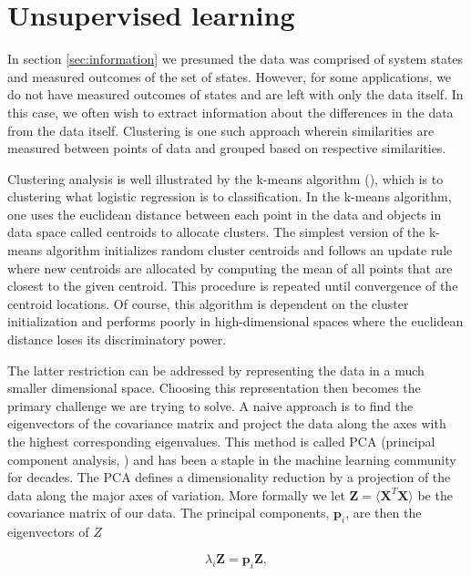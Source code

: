 \section{Unsupervised learning}\label{sec:unsupervised_learning}

In section \ref{sec:information} we presumed the data was comprised of system states and measured outcomes of the set of states. However, for some applications, we do not have measured outcomes of states and are left with only the data itself. In this case, we often wish to extract information about the differences in the data from the data itself. Clustering is one such approach wherein similarities are measured between points of data and grouped based on respective similarities.

Clustering analysis is well illustrated by the k-means algorithm (\cite{Neyman1967}), which is to clustering what logistic regression is to classification.  In the k-means algorithm, one uses the euclidean distance between each point in the data and objects in data space called centroids to allocate clusters. The simplest version of the k-means algorithm initializes random cluster centroids and follows an update rule where new centroids are allocated by computing the mean of all points that are closest to the given centroid. This procedure is repeated until convergence of the centroid locations. Of course, this algorithm is dependent on the cluster initialization and performs poorly in high-dimensional spaces where the euclidean distance loses its discriminatory power. 

The latter restriction can be addressed by representing the data in a much smaller dimensional space. Choosing this representation then becomes the primary challenge we are trying to solve. A naive approach is to find the eigenvectors of the covariance matrix and project the data along the axes with the highest corresponding eigenvalues. This method is called PCA (principal component analysis, \cite{Marsland2009}) and has been a staple in the machine learning community for decades. The PCA defines a dimensionality reduction by a projection of the data along the major axes of variation. More formally we let $\mathbf{Z} = \langle \mathbf{X}^T\mathbf{X}\rangle$ be the covariance matrix of our data. The principal components, $\mathbf{p}_i$, are then the eigenvectors of $Z$ 

\begin{equation}\label{eq:pca}
\lambda_i \mathbf{Z} = \mathbf{p}_i \mathbf{Z},
\end{equation}

